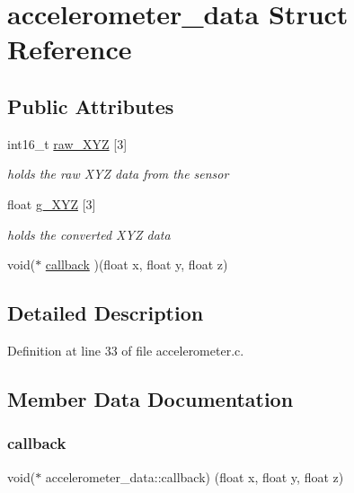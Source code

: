 \hypertarget{structaccelerometer__data}{}\section{accelerometer\+\_\+data Struct Reference}
\label{structaccelerometer__data}
\subsection*{Public Attributes}
\begin{DoxyCompactItemize}
\item 
int16\+\_\+t \mbox{\hyperlink{structaccelerometer__data_a30e93e2834f136bd887133f061e97451}{raw\+\_\+\+X\+YZ}} \mbox{[}3\mbox{]}
\begin{DoxyCompactList}\small\item\em holds the raw X\+YZ data from the sensor \end{DoxyCompactList}\item 
float \mbox{\hyperlink{structaccelerometer__data_adb29a615593df0207568aa0fad82d033}{g\+\_\+\+X\+YZ}} \mbox{[}3\mbox{]}
\begin{DoxyCompactList}\small\item\em holds the converted X\+YZ data \end{DoxyCompactList}\item 
void($\ast$ \mbox{\hyperlink{structaccelerometer__data_a6e334c6ecaa146a4a28910d4abd05e96}{callback}} )(float x, float y, float z)
\end{DoxyCompactItemize}


\subsection{Detailed Description}


Definition at line 33 of file accelerometer.\+c.



\subsection{Member Data Documentation}
\mbox{\label{structaccelerometer__data_a6e334c6ecaa146a4a28910d4abd05e96}} 
\subsubsection{\texorpdfstring{callback}{callback}}
{\footnotesize\ttfamily void($\ast$ accelerometer\+\_\+data\+::callback) (float x, float y, float z)}



